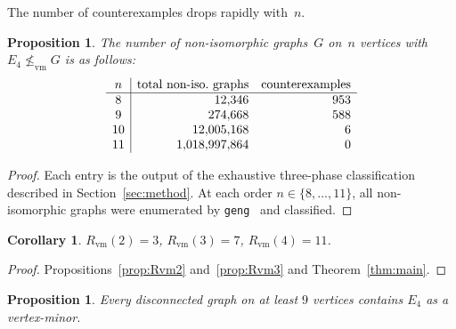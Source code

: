 \documentclass[11pt]{amsart}
\newtheorem{proposition}[theorem]{Proposition}
\newtheorem{corollary}[theorem]{Corollary}
\theoremstyle{definition}
\theoremstyle{remark}
\newcommand{\Rvm}{R_{\mathrm{vm}}}
\newcommand{\vm}{\leq_{\mathrm{vm}}}
\begin{document}
The number of counterexamples drops rapidly with~$n$.

\begin{proposition}\label{prop:counts}
  The number of non-isomorphic graphs~$G$ on~$n$ vertices with
  $E_4\not\vm G$ is as follows:
  \[
    \begin{array}{c|rr}
      n & \textup{total non-iso.\ graphs} & \textup{counterexamples}
      \\ \hline
      8  & 12{,}346         & 953 \\
      9  & 274{,}668        & 588 \\
      10 & 12{,}005{,}168   & 6 \\
      11 & 1{,}018{,}997{,}864 & 0
    \end{array}
  \]
\end{proposition}

\begin{proof}
  Each entry is the output of the exhaustive three-phase classification
  described in Section~\ref{sec:method}.  At each order $n\in\{8,\dots,
  11\}$, all non-isomorphic graphs were enumerated by
  \texttt{geng}~\cite{McKayPiperno2014} and classified.
\end{proof}

\begin{corollary}\label{cor:values}
  $\Rvm(2) = 3$, \;\; $\Rvm(3) = 7$, \;\; $\Rvm(4) = 11$.
\end{corollary}

\begin{proof}
  Propositions~\ref{prop:Rvm2} and~\ref{prop:Rvm3} and
  Theorem~\ref{thm:main}.
\end{proof}


\begin{proposition}\label{prop:disconnected-k4}
  Every disconnected graph on at least $9$ vertices contains $E_4$
  as a vertex-minor.
\end{proposition}
\end{document}
